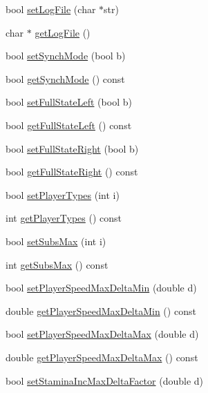 \begin{DoxyCompactItemize}
bool \hyperlink{classServerSettings_a3a1fc8f8e22ac5c066d447fcbeb932d2}{set\+Log\+File} (char $\ast$str)
\item 
char $\ast$ \hyperlink{classServerSettings_a33856b4ce798a30ebcc2484980c22ab6}{get\+Log\+File} ()
\item 
bool \hyperlink{classServerSettings_a0c0ce0ac89c3243f7658b7262826b8c2}{set\+Synch\+Mode} (bool b)
\item 
bool \hyperlink{classServerSettings_a5e4741b63584e17556dd624221cf94e9}{get\+Synch\+Mode} () const 
\item 
bool \hyperlink{classServerSettings_a2b410587fb81822521cdbbbeed3fe4ee}{set\+Full\+State\+Left} (bool b)
\item 
bool \hyperlink{classServerSettings_a52b032d71c2d87c82cc9753dbd8cb568}{get\+Full\+State\+Left} () const 
\item 
bool \hyperlink{classServerSettings_a1d9cc6cfe1ba3de09f7fab7d2277cc2b}{set\+Full\+State\+Right} (bool b)
\item 
bool \hyperlink{classServerSettings_a59006e348c5bf744aacdf5eae8af85c8}{get\+Full\+State\+Right} () const 
\item 
bool \hyperlink{classServerSettings_af4601c1d32690d2bc23200b7bd39d56d}{set\+Player\+Types} (int i)
\item 
int \hyperlink{classServerSettings_a3ea2d972b477489f16f9044e77b33517}{get\+Player\+Types} () const 
\item 
bool \hyperlink{classServerSettings_ab270bf7eef5016ebaf6aeb9e3b4d7680}{set\+Subs\+Max} (int i)
\item 
int \hyperlink{classServerSettings_a9a8e99334d23099191cef30be2a365d9}{get\+Subs\+Max} () const 
\item 
bool \hyperlink{classServerSettings_a732188ae4d8068768a4974e5e09e7d91}{set\+Player\+Speed\+Max\+Delta\+Min} (double d)
\item 
double \hyperlink{classServerSettings_ab2358daa4b23f1f2342f23f76b466af8}{get\+Player\+Speed\+Max\+Delta\+Min} () const 
\item 
bool \hyperlink{classServerSettings_acfdafdeacd1d291d7aeaa145cc3610dd}{set\+Player\+Speed\+Max\+Delta\+Max} (double d)
\item 
double \hyperlink{classServerSettings_a8fb5c7b85dcec6f05702c6284ff4bd45}{get\+Player\+Speed\+Max\+Delta\+Max} () const 
\item 
bool \hyperlink{classServerSettings_a8b4aa98bda2350c35e35748b33c1880f}{set\+Stamina\+Inc\+Max\+Delta\+Factor} (double d)
\item 

\end{DoxyCompactItemize}
